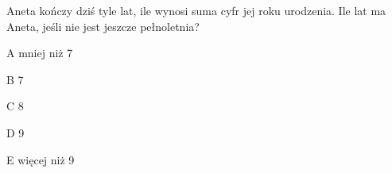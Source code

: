 \begin{tresc}
Aneta kończy dziś tyle lat, ile wynosi suma cyfr jej roku urodzenia. Ile lat ma Aneta, jeśli nie jest jeszcze pełnoletnia?
\end{tresc}
\begin{wariant}{A} mniej niż 7 \end{wariant}
\begin{wariant}{B} 7 \end{wariant}
\begin{wariant}{C} 8 \end{wariant}
\begin{wariant}{D} 9 \end{wariant}
\begin{wariant}{E} więcej niż 9 \end{wariant}
